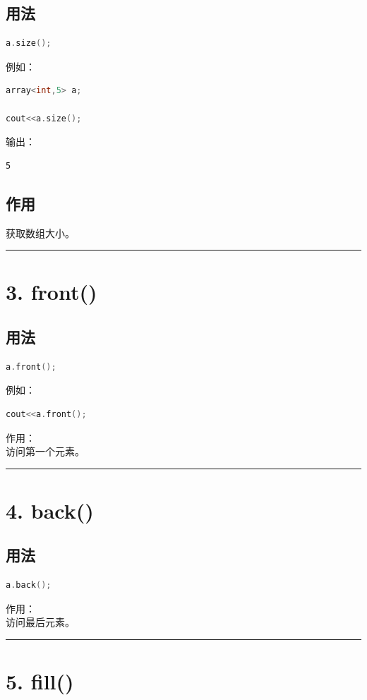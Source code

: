 \documentclass[9pt,twocolumn]{extarticle}
\begin{document}
\subsection{用法}
\begin{lstlisting}[language=C++]
a.size();
\end{lstlisting}
例如：
\begin{lstlisting}[language=C++]
array<int,5> a;

cout<<a.size();
\end{lstlisting}
输出：
\begin{lstlisting}
5
\end{lstlisting}

\subsection{作用}
获取数组大小。

\noindent\rule{\linewidth}{0.4pt}

\section{3. front()}

\subsection{用法}
\begin{lstlisting}[language=C++]
a.front();
\end{lstlisting}
例如：
\begin{lstlisting}[language=C++]
cout<<a.front();
\end{lstlisting}
作用：\\
访问第一个元素。

\noindent\rule{\linewidth}{0.4pt}

\section{4. back()}

\subsection{用法}
\begin{lstlisting}[language=C++]
a.back();
\end{lstlisting}
作用：\\
访问最后元素。

\noindent\rule{\linewidth}{0.4pt}

\section{5. fill()}
\end{document}
